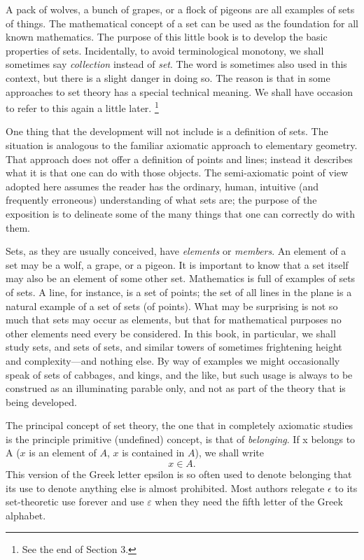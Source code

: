 A pack of wolves, a bunch of grapes, or a flock of pigeons
  are all examples of sets of things.
The mathematical concept of a set can be used as the
  foundation for all known mathematics.
The purpose of this little book is to develop the basic
  properties of sets.
Incidentally, to avoid terminological monotony, we shall sometimes
  say \textit{collection} instead of \textit{set}.
The word  is sometimes also used in this context,
  but there is a slight danger in doing so.
The reason is that in some approaches to set theory 
  has a special technical meaning.
We shall have occasion to refer to this again a little later.
  \ifhmode\unskip\fi\footnote{
  See the end of Section 3.
  }

One thing that the development will not include is a definition
  of sets.
The situation is analogous to the familiar axiomatic approach to
  elementary geometry.
That approach does not offer a definition of points and lines;
  instead it describes what it is that one can do with those
  objects.
The semi-axiomatic point of view adopted here assumes the reader
  has the ordinary, human, intuitive (and frequently erroneous)
  understanding of what sets are; the purpose of the exposition is
  to delineate some of the many things that one can correctly do
  with them.

Sets, as they are usually conceived, have \textit{elements} or
  \textit{members}.
An element of a set may be a wolf, a grape, or a pigeon.
It is important to know that a set itself may also be an
  element of some other set.
Mathematics is full of examples of sets of sets.
A line, for instance, is a set of points; the set of all
  lines in the plane is a natural example of a set of sets (of
  points).
What may be surprising is not so much that sets may occur as
  elements, but that for mathematical purposes no other elements
  need every be considered.
In this book, in particular, we shall study sets, and sets of
  sets, and similar towers of sometimes frightening height and
  complexity---and nothing else.
By way of examples we might occasionally speak of sets of
  cabbages, and kings, and the like, but such usage is always to
  be construed as an illuminating parable only, and not as part
  of the theory that is being developed.

The principal concept of set theory, the one that in completely
  axiomatic studies is the principle primitive (undefined) concept,
  is that of \textit{belonging}.
If x belongs to A ($x$ is an element of $A$, $x$ is
  contained in $A$), we shall write
  \[
  x \in A.
  \]
This version of the Greek letter epsilon is so often used to
  denote belonging that its use to denote anything else is almost
  prohibited.
Most authors relegate $\epsilon$ to its set-theoretic use forever
  and use $\varepsilon$ when they need the fifth letter of the
  Greek alphabet.

